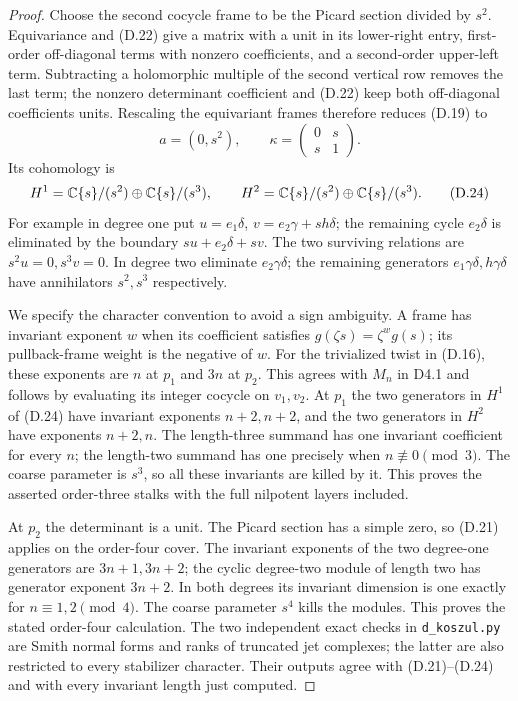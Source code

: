 \begin{proof}
Choose the second cocycle frame to be the Picard section divided by
$s^2$. Equivariance and (D.22) give a matrix with a unit in its
lower-right entry, first-order off-diagonal terms with nonzero
coefficients, and a second-order upper-left term. Subtracting a
holomorphic multiple of the second vertical row removes the last
term; the nonzero determinant coefficient and (D.22) keep both
off-diagonal coefficients units. Rescaling the equivariant frames
therefore reduces (D.19) to
\[
 a=(0,s^2),\qquad \kappa=\begin{pmatrix}0&s\\s&1\end{pmatrix}. \tag{D.23}
\]
Its cohomology is
\[
 H^1=\mathbb C\{s\}/(s^2)\oplus\mathbb C\{s\}/(s^3),\qquad
 H^2=\mathbb C\{s\}/(s^2)\oplus\mathbb C\{s\}/(s^3).             \tag{D.24}
\]
For example in degree one put
$u=e_1\delta$, $v=e_2\gamma+s h\delta$; the remaining cycle
$e_2\delta$ is eliminated by the boundary
$s u+e_2\delta+s v$. The two surviving relations are
$s^2u=0,s^3v=0$. In degree two eliminate $e_2\gamma\delta$;
the remaining generators $e_1\gamma\delta,h\gamma\delta$
have annihilators $s^2,s^3$ respectively.

We specify the character convention to avoid a sign ambiguity.
A frame has invariant exponent $w$ when its coefficient satisfies
$g(\zeta s)=\zeta^w g(s)$; its pullback-frame weight is the negative
of $w$. For the trivialized twist in (D.16), these exponents are
$n$ at $p_1$ and $3n$ at $p_2$. This agrees with $M_n$ in D4.1
and follows by evaluating its integer cocycle on $v_1,v_2$.
At $p_1$ the two generators in $H^1$ of (D.24) have invariant
exponents $n+2,n+2$, and the two generators in $H^2$ have exponents
$n+2,n$. The length-three summand has one invariant coefficient
for every $n$; the length-two summand has one precisely when
$n\not\equiv0\pmod3$. The coarse parameter is $s^3$, so all these
invariants are killed by it. This proves the asserted order-three
stalks with the full nilpotent layers included.

At $p_2$ the determinant is a unit. The Picard section has a simple
zero, so (D.21) applies on the order-four cover. The invariant
exponents of the two degree-one generators are $3n+1,3n+2$;
the cyclic degree-two module of length two has generator exponent
$3n+2$. In both degrees its invariant dimension is one exactly for
$n\equiv1,2\pmod4$. The coarse parameter $s^4$ kills the modules.
This proves the stated order-four calculation. The two independent
exact checks in \texttt{d\_koszul.py} are Smith normal forms and
ranks of truncated jet complexes; the latter are also restricted to
every stabilizer character. Their outputs agree with (D.21)--(D.24)
and with every invariant length just computed.
\end{proof}

